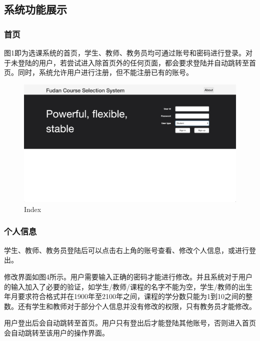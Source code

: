 \documentclass[a4paper, 11pt, nofonts, nocap, fancyhdr]{ctexart}
\begin{document}
\newpage
\subsection{系统功能展示}

\subsubsection{首页}
图1即为选课系统的首页，学生、教师、教务员均可通过账号和密码进行登录。对于未登陆的用户，若尝试进入除首页外的任何页面，都会要求登陆并自动跳转至首页。同时，系统允许用户进行注册，但不能注册已有的账号。

	\begin{figure}[ht]
		\centering
		\includegraphics[width=6in]{overview}
		\caption{Index}
	\end{figure}


\newpage
\subsubsection{个人信息}
学生、教师、教务员登陆后可以点击右上角的账号查看、修改个人信息，或进行登出。

修改界面如图4所示。用户需要输入正确的密码才能进行修改。并且系统对于用户的输入加入了必要的验证，如学生/教师/课程的名字不能为空，学生/教师的出生年月要求符合格式并在1900年至2100年之间，课程的学分数只能为1到10之间的整数。还有学生和教师对于部分个人信息并没有修改的权限，只有教务员才能修改。

用户登出后会自动跳转至首页。用户只有登出后才能登陆其他账号，否则进入首页会自动跳转至该用户的操作界面。
\end{document}
